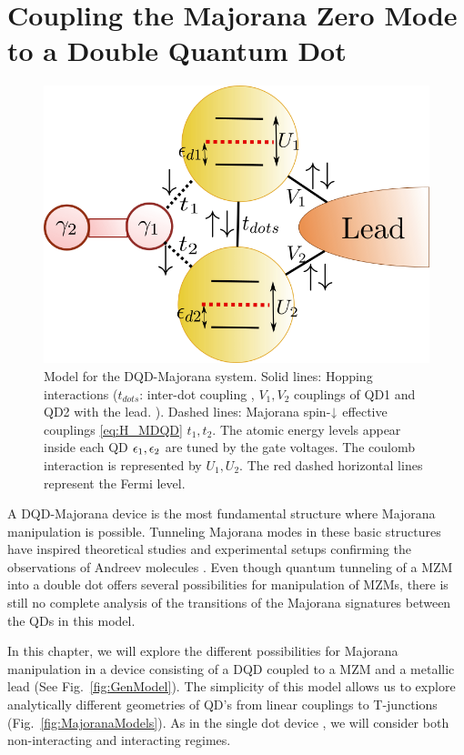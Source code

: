 \chapter{Coupling the Majorana Zero Mode to a Double Quantum Dot \label{chap:Results} }
\begin{figure}[hbt]
    \centering
    \includegraphics[scale=0.4]{IMAGES/GenModel.png}
    \caption{\label{fig:GeneralModel} Model for the DQD-Majorana system. Solid lines: Hopping interactions ($t_{dots}$: inter-dot coupling , $V_1,V_2$ couplings of QD1 and QD2 with the lead. ). Dashed lines: Majorana spin-$\downarrow$ effective couplings \eqref{eq:H_MDQD} $t_1,t_2$. The atomic energy levels appear inside each QD $\epsilon_1, \epsilon_2$ are tuned by the gate voltages. The coulomb interaction is represented by $U_1,U_2$.  The red dashed horizontal lines represent the Fermi level. \protect {} } 
\end{figure}

\noindent A DQD-Majorana device is the most fundamental structure where Majorana manipulation is possible. Tunneling Majorana modes in these basic structures have inspired theoretical studies \cite{silva_andreev_2016,ivanov_coherent_2017} and experimental setups confirming the observations of Andreev molecules \cite{su_andreev_2017}. Even though quantum tunneling of a MZM into a double dot offers several possibilities for manipulation of MZMs,  there is still no complete analysis of the transitions of the Majorana signatures between the QDs in this model. 

 In this chapter, we will explore the different possibilities for Majorana manipulation in a device consisting of a DQD coupled to a MZM and a metallic lead (See Fig.\ \ref{fig:GenModel}). The simplicity of this model allows us to explore analytically different geometries of QD's from linear couplings to T-junctions (Fig.\ \ref{fig:MajoranaModels}). As in the single dot device , we will consider both non-interacting and interacting regimes. 


